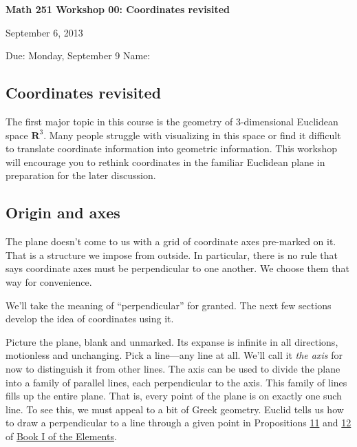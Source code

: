 \documentclass[12pt]{exam}
\theoremstyle{definition}
\begin{document}
\lstset{language=R}
\noindent
\textbf{{\large Math 251 \hfill Workshop 00: Coordinates revisited}}

\noindent
September 6, 2013 

\noindent
Due: Monday, September 9 \hfill Name: \underline{\hspace{3in}} 

\noindent

\subsection{Coordinates revisited}

The first major topic in this course is the geometry of 3-dimensional
Euclidean space $\mathbf{R}^3$. Many people struggle with visualizing in
this space or find it difficult to translate coordinate information into
geometric information. This workshop will encourage you to rethink
coordinates in the familiar Euclidean plane in preparation for the later
discussion.

\subsection{Origin and axes}

The plane doesn't come to us with a grid of coordinate axes pre-marked
on it. That is a structure we impose from outside. In particular, there
is no rule that says coordinate axes must be perpendicular to one
another. We choose them that way for convenience.

We'll take the meaning of ``perpendicular'' for granted. The next few
sections develop the idea of coordinates using it.

Picture the plane, blank and unmarked. Its expanse is infinite in all
directions, motionless and unchanging. Pick a line---any line at all.
We'll call it \emph{the axis} for now to distinguish it from other
lines. The axis can be used to divide the plane into a family of
parallel lines, each perpendicular to the axis. This family of lines
fills up the entire plane. That is, every point of the plane is on
exactly one such line. To see this, we must appeal to a bit of Greek
geometry. Euclid tells us how to draw a perpendicular to a line through
a given point in Propositions
\href{http://aleph0.clarku.edu/~djoyce/java/elements/bookI/propI11.html}{11}
and
\href{http://aleph0.clarku.edu/~djoyce/java/elements/bookI/propI12.html}{12}
of \href{http://aleph0.clarku.edu/~djoyce/java/elements/bookI.html}{Book
I of the Elements}.
\end{document}
